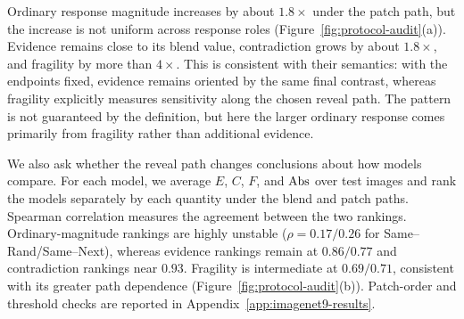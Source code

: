 Ordinary response magnitude increases by about $1.8\times$ under the patch
path, but the increase is not uniform across response roles
(Figure~\ref{fig:protocol-audit}(a)). Evidence remains close to its blend value,
contradiction grows by about $1.8\times$, and fragility by more than
$4\times$. This is consistent with their semantics: with the endpoints fixed,
evidence remains oriented by the same final contrast, whereas fragility
explicitly measures sensitivity along the chosen reveal path. The pattern is
not guaranteed by the definition, but here the larger ordinary response comes
primarily from fragility rather than additional evidence.

We also ask whether the reveal path changes conclusions about how models
compare. For each model, we average $E$, $C$, $F$, and $\mathrm{Abs}$ over test images
and rank the models separately by each quantity under the blend and patch
paths. Spearman correlation measures the agreement between the two rankings.
Ordinary-magnitude rankings are highly unstable
($\rho=0.17/0.26$ for Same--Rand/Same--Next), whereas evidence rankings remain
at $0.86/0.77$ and contradiction rankings near $0.93$. Fragility is
intermediate at $0.69/0.71$, consistent with its greater path dependence
(Figure~\ref{fig:protocol-audit}(b)). Patch-order and threshold checks are
reported in Appendix~\ref{app:imagenet9-results}.